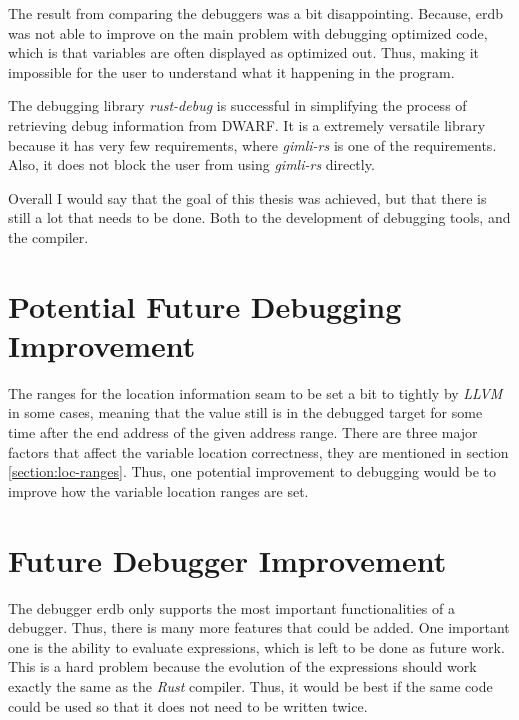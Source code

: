 

The result from comparing the debuggers was a bit disappointing.
Because, \gls{erdb} was not able to improve on the main problem with debugging optimized code, which is that variables are often displayed as optimized out.
Thus, making it impossible for the user to understand what it happening in the program.


The debugging library \emph{rust-debug} is successful in simplifying the process of retrieving debug information from \gls{DWARF}.
It is a extremely versatile library because it has very few requirements, where \emph{gimli-rs} is one of the requirements.
Also, it does not block the user from using \emph{gimli-rs} directly.


Overall I would say that the goal of this thesis was achieved, but that there is still a lot that needs to be done.
Both to the development of debugging tools, and the compiler.


\section{Potential Future Debugging Improvement}
The ranges for the location information seam to be set a bit to tightly by \emph{LLVM} in some cases, meaning that the value still is in the debugged target for some time after the end address of the given address range.
There are three major factors that affect the variable location correctness, they are mentioned in section \ref{section:loc-ranges}.
Thus, one potential improvement to debugging would be to improve how the variable location ranges are set.


\section{Future Debugger Improvement}
The debugger \gls{erdb} only supports the most important functionalities of a debugger.
Thus, there is many more features that could be added.
One important one is the ability to evaluate expressions, which is left to be done as future work.
This is a hard problem because the evolution of the expressions should work exactly the same as the \emph{Rust} compiler.
Thus, it would be best if the same code could be used so that it does not need to be written twice.


